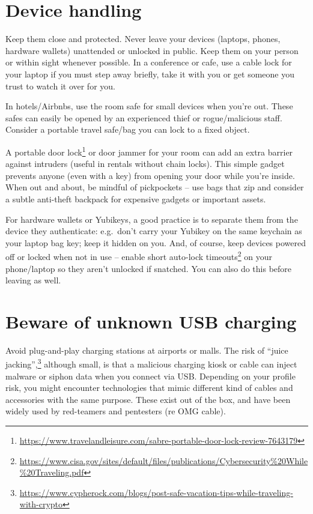 \section{Device handling}

Keep them close and protected. Never leave your devices
(laptops, phones, hardware wallets) unattended or unlocked
in public. Keep them on your person or within sight
whenever possible. In a conference or cafe, use a cable
lock for your laptop if you must step away briefly, take
it with you or get someone you trust to watch it over for
you.

In hotels/Airbnbs, use the room safe for small devices
when you're out. These safes can easily be opened by an
experienced thief or rogue/malicious staff. Consider a
portable travel safe/bag you can lock to a fixed object.

A portable door
lock\footnote{\url{https://www.travelandleisure.com/sabre-portable-door-lock-review-7643179}}
or door jammer for your room can add an extra barrier
against intruders (useful in rentals without chain locks).
This simple gadget prevents anyone (even with a key) from
opening your door while you're inside. When out and about,
be mindful of pickpockets -- use bags that zip and
consider a subtle anti-theft backpack for expensive
gadgets or important assets.

For hardware wallets or Yubikeys, a good practice is to
separate them from the device they authenticate: e.g.\
don't carry your Yubikey on the same keychain as your
laptop bag key; keep it hidden on you. And, of course,
keep devices powered off or locked when not in use --
enable short auto-lock
timeouts\footnote{\url{https://www.cisa.gov/sites/default/files/publications/Cybersecurity\%20While\%20Traveling.pdf}}
on your phone/laptop so they aren't unlocked if snatched.
You can also do this before leaving as well.

\section{Beware of unknown USB charging}

Avoid plug-and-play charging stations at airports or
malls. The risk of ``juice
jacking'',\footnote{\url{https://www.cypherock.com/blogs/post-safe-vacation-tips-while-traveling-with-crypto}}
although small, is that a malicious charging kiosk or
cable can inject malware or siphon data when you connect
via USB. Depending on your profile risk, you might
encounter technologies that mimic different kind of cables
and accessories with the same purpose. These exist out of
the box, and have been widely used by red-teamers and
pentesters (re OMG cable).

